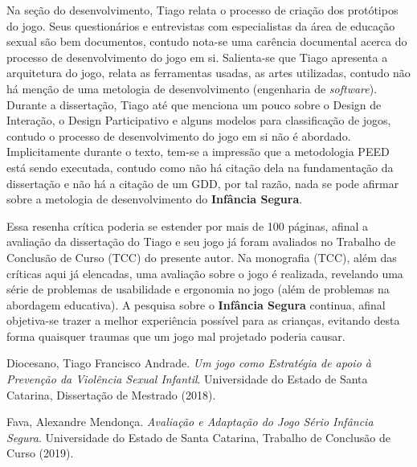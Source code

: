 \documentclass[12pt]{article}
\begin{document}
Na seção do desenvolvimento, Tiago relata o processo de criação dos protótipos do jogo. Seus questionários e entrevistas com especialistas da área de educação sexual são bem documentos, contudo nota-se uma carência documental acerca do processo de desenvolvimento do jogo em si. Salienta-se que Tiago apresenta a arquitetura do jogo, relata as ferramentas usadas, as artes utilizadas, contudo não há menção de uma metologia de desenvolvimento (engenharia de \textit{software}). Durante a dissertação, Tiago até que menciona um pouco sobre o Design de Interação, o Design Participativo e alguns modelos para classificação de jogos, contudo o processo de desenvolvimento do jogo em si não é abordado. Implicitamente durante o texto, tem-se a impressão que a metodologia PEED está sendo executada, contudo como não há citação dela na fundamentação da dissertação e não há a citação de um GDD, por tal razão, nada se pode afirmar sobre a metologia de desenvolvimento do \textbf{Infância Segura}. 

Essa resenha crítica poderia se estender por mais de 100 páginas, afinal a avaliação da dissertação do Tiago e seu jogo já foram avaliados no Trabalho de Conclusão de Curso (TCC) do presente autor. Na monografia (TCC), além das críticas aqui já elencadas, uma avaliação sobre o jogo é realizada, revelando uma série de problemas de usabilidade e ergonomia no jogo (além de problemas na abordagem educativa). A pesquisa sobre o \textbf{Infância Segura} continua, afinal objetiva-se trazer a melhor experiência possível para as crianças, evitando desta forma quaisquer traumas que um jogo mal projetado poderia causar. 


\begin{thebibliography}{9}

Diocesano, Tiago Francisco Andrade.
\textit{Um jogo como Estratégia de apoio à Prevenção da Violência Sexual Infantil}.
Universidade do Estado de Santa Catarina, Dissertação de Mestrado (2018).

Fava, Alexandre Mendonça.
\textit{Avaliação e Adaptação do Jogo Sério Infância Segura}.
Universidade do Estado de Santa Catarina, Trabalho de Conclusão de Curso (2019).

\end{thebibliography}
\end{document}
